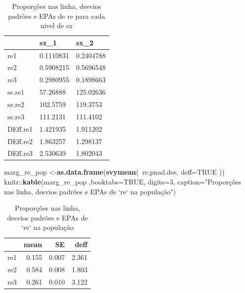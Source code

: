 \documentclass[]{book}
\newenvironment{Shaded}{\begin{snugshade}}{\end{snugshade}}
\newcommand{\KeywordTok}[1]{\textcolor[rgb]{0.13,0.29,0.53}{\textbf{{#1}}}}
\newcommand{\DataTypeTok}[1]{\textcolor[rgb]{0.13,0.29,0.53}{{#1}}}
\newcommand{\DecValTok}[1]{\textcolor[rgb]{0.00,0.00,0.81}{{#1}}}
\newcommand{\StringTok}[1]{\textcolor[rgb]{0.31,0.60,0.02}{{#1}}}
\newcommand{\OtherTok}[1]{\textcolor[rgb]{0.56,0.35,0.01}{{#1}}}
\newcommand{\NormalTok}[1]{{#1}}
\numberwithin{example}{chapter}
\numberwithin{remark}{chapter}
\numberwithin{definition}{chapter}
\begin{document}
\begin{table}

\caption{\label{tab:proplinha}Proporções nas linha, desvios padrões e EPAs de re para cada nivel de sx}
\centering
\begin{tabular}[t]{lll}
\toprule
  & sx\_1 & sx\_2\\
\midrule
re1 & 0.1110831 & 0.2404788\\
re2 & 0.5908215 & 0.5696548\\
re3 & 0.2980955 & 0.1898663\\
se.re1 & 57.26888 & 125.02636\\
se.re2 & 102.5759 & 119.3753\\
\addlinespace
se.re3 & 111.2131 & 111.4102\\
DEff.re1 & 1.421935 & 1.911202\\
DEff.re2 & 1.863257 & 1.298137\\
DEff.re3 & 2.530639 & 1.802043\\
\bottomrule
\end{tabular}
\end{table}

\begin{Shaded}
\begin{Highlighting}[]
\NormalTok{marg_re_pop <-}\KeywordTok{as.data.frame}\NormalTok{(}\KeywordTok{svymean}\NormalTok{(~re,pnad.des, }\DataTypeTok{deff=}\OtherTok{TRUE} \NormalTok{))}
\NormalTok{knitr::}\KeywordTok{kable}\NormalTok{(marg_re_pop ,}\DataTypeTok{booktabs=}\OtherTok{TRUE}\NormalTok{, }\DataTypeTok{digits=}\DecValTok{3}\NormalTok{,}
  \DataTypeTok{caption=}\StringTok{"Proporções nas linha, desvios padrões e EPAs de `re` na população"}\NormalTok{)}
\end{Highlighting}
\end{Shaded}

\begin{table}

\caption{\label{tab:unnamed-chunk-98}Proporções nas linha, desvios padrões e EPAs de `re` na população}
\centering
\begin{tabular}[t]{lrrr}
\toprule
  & mean & SE & deff\\
\midrule
re1 & 0.155 & 0.007 & 2.361\\
re2 & 0.584 & 0.008 & 1.803\\
re3 & 0.261 & 0.010 & 3.122\\
\bottomrule
\end{tabular}
\end{table}
\end{document}
